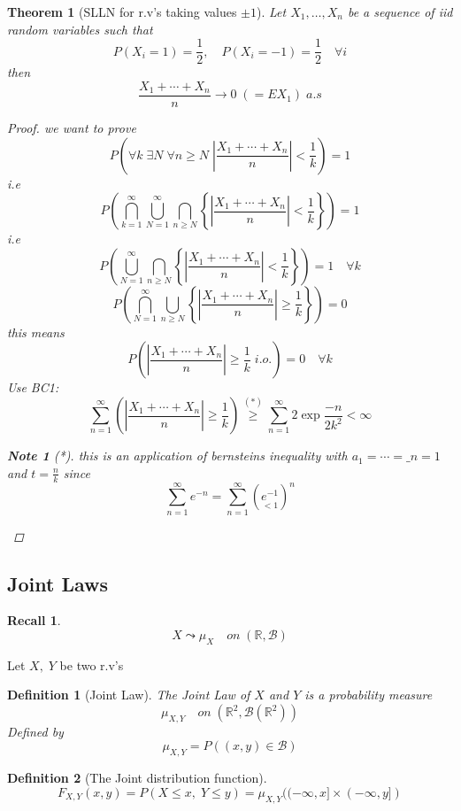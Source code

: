 \documentclass[12pt]{article}
\def\RR{\mathbb{R}}
\newtheorem{theorem}{Theorem}[section]
\newtheorem{definition}{Definition}[section]
\newtheorem*{note}{Note}
\newtheorem*{recall}{Recall}
\begin{document}
\begin{theorem}[SLLN for r.v's taking values $\pm 1$]
Let $X_1 , \dots , X_n$ be a sequence of iid random variables such that 
\[P(X_i=1)=\frac{1}{2}, \quad P(X_i=-1)=\frac{1}{2} \quad \forall  i  \]
then
\[\frac{X_1 + \cdots + X_n}{n}\rightarrow 0 \;(=EX_1) \; a.s\]
\begin{proof}
we want to prove 
\[P\left(\forall k \; \exists N \; \forall n \geq N \; \left|\frac{X_1 + \cdots + X_n}{n}\right|<\frac{1}{k} \right) =1\]
i.e
\[P\left(\bigcap_{k=1}^{\infty}\bigcup_{N=1}^{\infty}\bigcap_{n \geq N} \left\{ \left|\frac{X_1 + \cdots + X_n}{n}\right|<\frac{1}{k}  \right\} \right) =1\]
i.e 
\[P\left(\bigcup_{N=1}^{\infty}\bigcap_{n \geq N} \left\{ \left|\frac{X_1 + \cdots + X_n}{n}\right|<\frac{1}{k}  \right\} \right) =1 \quad \forall k\]
\[P\left(\bigcap_{N=1}^{\infty}\bigcup_{n \geq N} \left\{ \left|\frac{X_1 + \cdots + X_n}{n}\right| \geq \frac{1}{k}  \right\} \right) =0 \]
this means 
\[P\left( \left|\frac{X_1 + \cdots + X_n}{n}\right| \geq \frac{1}{k} \; i.o.  \right) =0 \quad \forall k\]
Use BC1:
\[\sum\limits_{n=1}^{\infty}\left( \left|\frac{X_1 + \cdots + X_n}{n}\right| \geq \frac{1}{k}  \right) \overset{(*)}{\geq} \sum\limits_{n=1}^{\infty}2\exp{\frac{-n}{2k^2}} < \infty\]
\begin{note}[*] this is an application of bernsteins inequality with $a_1= \cdots= \_n = 1$ and $t=\frac{n}{k}$ since
\[\sum\limits_{n=1}^{\infty}e^{-n} = \sum\limits_{n=1}^{\infty}(\underset{<1}{e^{-1}})^{n} \]
\end{note}
\end{proof}
\end{theorem}

\subsection{Joint Laws}
\begin{recall}\[X \leadsto \mu_X \quad on \; (\RR, \mathcal{B}) \] \end{recall}
Let $X, \; Y$ be two r.v's
\begin{definition}[Joint Law]
The Joint Law of $X$ and $Y$ is a probability measure
\[\mu_{X,Y} \quad on \; (\RR^2, \mathcal{B}(\RR^2)) \]
Defined by 
\[\mu_{X,Y} = P((x,y) \in \mathcal{B})\]
\end{definition}
\begin{definition}[The Joint distribution function]
\[F_{X,Y}(x,y)=P(X\leq x , \; Y \leq y) = \mu_{X,Y}((-\infty,x]\times (- \infty, y])\]
\end{definition}
\end{document}
